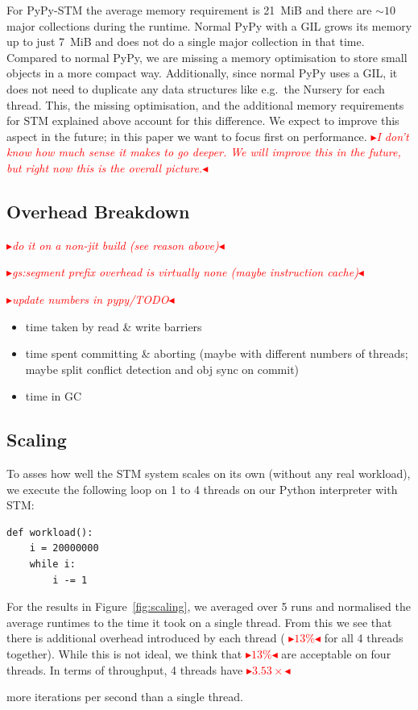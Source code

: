 \documentclass{sigplanconf}
\newcommand{\mynote}[2]{%
  \textcolor{red}{%
    \fbox{\bfseries\sffamily\scriptsize#1}%
    {\small$\blacktriangleright$\textsf{\emph{#2}}$\blacktriangleleft$}%
  }%
}
\newcommand\remi[1]{\mynote{Remi}{#1}}
\begin{document}
For PyPy-STM the average memory requirement is 21~MiB and there are
$\sim 10$ major collections during the runtime. Normal PyPy with a GIL
grows its memory up to just 7~MiB and does not do a single major
collection in that time. Compared to normal PyPy, we are missing a
memory optimisation to store small objects in a more compact
way. Additionally, since normal PyPy uses a GIL, it does not need to
duplicate any data structures like e.g.\ the Nursery for each
thread. This, the missing optimisation, and the additional memory
requirements for STM explained above account for this difference.
We expect to improve this aspect in the future; in this paper we
want to focus first on performance.
\remi{I don't know how much sense it makes to go deeper. We will
improve this in the future, but right now this is the overall picture.}



\subsection{Overhead Breakdown}

\remi{do it on a non-jit build (see reason above)}
\remi{gs:segment prefix overhead is virtually none (maybe instruction cache)}
\remi{update numbers in pypy/TODO}

\begin{itemize}
\item time taken by read \& write barriers
\item time spent committing \& aborting (maybe with different numbers
  of threads; maybe split conflict detection and obj sync on commit)
\item time in GC
\end{itemize}


\subsection{Scaling}

To asses how well the STM system scales on its own (without any real
workload), we execute the following loop on 1 to 4 threads on our
Python interpreter with STM:
\begin{lstlisting}
def workload():
    i = 20000000
    while i:
        i -= 1
\end{lstlisting}

For the results in Figure~\ref{fig:scaling}, we averaged over 5 runs
and normalised the average runtimes to the time it took on a single
thread. From this we see that there is additional overhead introduced
by each thread (\remi{$13\%$} for all 4 threads together). While this
is not ideal, we think that \remi{$13\%$} are acceptable on four
threads. In terms of throughput, 4 threads have \remi{$3.53\times$}
more iterations per second than a single thread.
\end{document}
